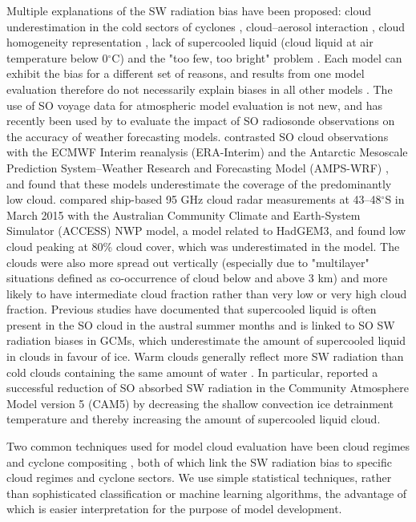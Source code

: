 Multiple explanations of the SW radiation bias have been proposed: cloud
underestimation in the cold sectors of cyclones \citep{bodas-salcedo2014},
cloud--aerosol interaction \citep{vergara-temprado2018}, cloud homogeneity
representation \citep{loveridge2018}, lack of supercooled liquid (cloud liquid
at air temperature below 0$^\circ$C) \citep{kay2016,bodas-salcedo2016} and the
"too few, too bright" problem \citep{nam2012,klein2013,wall2017}. Each model
can exhibit the bias for a different set of reasons, and results from one model
evaluation therefore do not necessarily explain biases in all other models
\citep{mason2015}. The use of SO voyage data for atmospheric model evaluation
is not new, and has recently been used by \cite{sato2018} to evaluate the
impact of SO radiosonde observations on the accuracy of weather forecasting
models. \cite{klekociuk2020} contrasted SO cloud observations with the ECMWF
Interim reanalysis (ERA-Interim) and the Antarctic Mesoscale Prediction
System--Weather Research and Forecasting Model (AMPS-WRF) \citep{powers2012},
and found that these
models underestimate the coverage of the predominantly low cloud.
\cite{protat2017} compared ship-based 95 GHz cloud radar measurements at
43--48$^\circ$S in March 2015 with the Australian Community Climate and
Earth-System Simulator (ACCESS) NWP model, a model related to HadGEM3, and
found low cloud peaking at 80\% cloud cover, which was underestimated in the
model. The clouds were also more spread out vertically (especially due to
"multilayer" situations defined as co-occurrence of cloud below and above 3
km) and more likely to have intermediate cloud fraction rather than very low or
very high cloud fraction. Previous studies have documented that supercooled
liquid is often present in the SO cloud in the austral summer months
\citep{morrison2011,huang2012,chubb2013,huang2016,bodas-salcedo2016,jolly2018,listowski2019}
and is linked to SO SW radiation biases in GCMs, which underestimate the amount
of supercooled liquid in clouds in favour of ice. Warm clouds generally reflect
more SW radiation than cold clouds containing the same amount of water
\citep{vergara-temprado2018}. In particular, \cite{kay2016} reported a
successful reduction of SO absorbed SW radiation in the Community Atmosphere
Model version 5 (CAM5) by decreasing the shallow convection ice detrainment
temperature and thereby increasing the amount of supercooled liquid cloud.

Two common techniques used for model cloud evaluation have been cloud regimes
\citep{williams2009a,haynes2011,mason2014,mason2015,mcdonald2016,jin2017,mcdonald2018,schuddeboom2018,schuddeboom2019}
and cyclone compositing
\citep{bodas-salcedo2012,williams2013,bodas-salcedo2014,bodas-salcedo2016,williams2017},
both of which link the SW radiation bias to specific cloud regimes and cyclone
sectors. We use simple statistical techniques, rather than sophisticated
classification or machine learning algorithms, the advantage of which is easier
interpretation for the purpose of model development.

